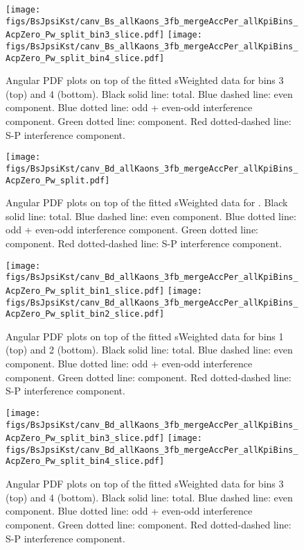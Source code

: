 %
\begin{figure}[h]
     \caption{\small Angular PDF plots on top of the fitted sWeighted data for \BsJpsiKst \mkpi bins 3 (top) and 4 (bottom). Black solid line: total. Blue dashed line: \pwave even component. Blue dotted line: \pwave odd + even-odd interference component. Green dotted line: \swave component. Red dotted-dashed line: S-P interference component.}
     \texttt{[image: figs/BsJpsiKst/canv\_Bs\_allKaons\_3fb\_mergeAccPer\_allKpiBins\_AcpZero\_Pw\_split\_bin3\_slice.pdf]}     
     \texttt{[image: figs/BsJpsiKst/canv\_Bs\_allKaons\_3fb\_mergeAccPer\_allKpiBins\_AcpZero\_Pw\_split\_bin4\_slice.pdf]}     
     \label{fig:angular_plots_Bs_bin3_bin4}
\end{figure}
\begin{figure}[h]
     \caption{\small Angular PDF plots on top of the fitted sWeighted data for \BsJpsiKst. Black solid line: total. Blue dashed line: \pwave even component. Blue dotted line: \pwave odd + even-odd interference component. Green dotted line: \swave component. Red dotted-dashed line: S-P interference component.}
     \texttt{[image: figs/BsJpsiKst/canv\_Bd\_allKaons\_3fb\_mergeAccPer\_allKpiBins\_AcpZero\_Pw\_split.pdf]}
     \label{fig:angular_plots_Bd}
\end{figure}
%
\begin{figure}[h]
     \caption{\small Angular PDF plots on top of the fitted sWeighted data for \BsJpsiKst \mkpi bins 1 (top) and 2 (bottom). Black solid line: total. Blue dashed line: \pwave even component. Blue dotted line: \pwave odd + even-odd interference component. Green dotted line: \swave component. Red dotted-dashed line: S-P interference component.}
     \texttt{[image: figs/BsJpsiKst/canv\_Bd\_allKaons\_3fb\_mergeAccPer\_allKpiBins\_AcpZero\_Pw\_split\_bin1\_slice.pdf]}     
     \texttt{[image: figs/BsJpsiKst/canv\_Bd\_allKaons\_3fb\_mergeAccPer\_allKpiBins\_AcpZero\_Pw\_split\_bin2\_slice.pdf]}     
     \label{fig:angular_plots_Bd_bin1_bin2}
\end{figure}
%
\begin{figure}[h]
     \caption{\small Angular PDF plots on top of the fitted sWeighted data for \BsJpsiKst \mkpi bins 3 (top) and 4 (bottom). Black solid line: total. Blue dashed line: \pwave even component. Blue dotted line: \pwave odd + even-odd interference component. Green dotted line: \swave component. Red dotted-dashed line: S-P interference component.}
     \texttt{[image: figs/BsJpsiKst/canv\_Bd\_allKaons\_3fb\_mergeAccPer\_allKpiBins\_AcpZero\_Pw\_split\_bin3\_slice.pdf]}     
     \texttt{[image: figs/BsJpsiKst/canv\_Bd\_allKaons\_3fb\_mergeAccPer\_allKpiBins\_AcpZero\_Pw\_split\_bin4\_slice.pdf]}     
     \label{fig:angular_plots_Bd_bin3_bin4}
\end{figure}    
